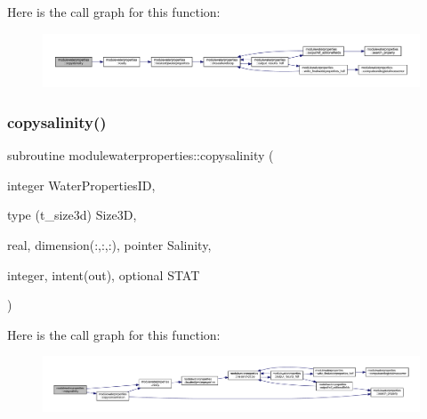 Here is the call graph for this function\+:\nopagebreak
\begin{figure}[H]
\begin{center}
\leavevmode
\includegraphics[width=350pt]{namespacemodulewaterproperties_a71b237b2c78cd159d5fc9be5a1a5f127_cgraph}
\end{center}
\end{figure}
\mbox{\label{namespacemodulewaterproperties_afb6f9f66ff7f1eabafe85dfdf9ddeca8}} 
\subsubsection{\texorpdfstring{copysalinity()}{copysalinity()}}
{\footnotesize\ttfamily subroutine modulewaterproperties\+::copysalinity (\begin{DoxyParamCaption}\item[{integer}]{Water\+Properties\+ID,  }\item[{type (t\+\_\+size3d)}]{Size3D,  }\item[{real, dimension(\+:,\+:,\+:), pointer}]{Salinity,  }\item[{integer, intent(out), optional}]{S\+T\+AT }\end{DoxyParamCaption})\hspace{0.3cm}{\ttfamily [private]}}

Here is the call graph for this function\+:\nopagebreak
\begin{figure}[H]
\begin{center}
\leavevmode
\includegraphics[width=350pt]{namespacemodulewaterproperties_afb6f9f66ff7f1eabafe85dfdf9ddeca8_cgraph}
\end{center}
\end{figure}
\mbox{\label{namespacemodulewaterproperties_a6c8ccf3bc2c3f4cc47ee4ebfd2a2b354}} 

